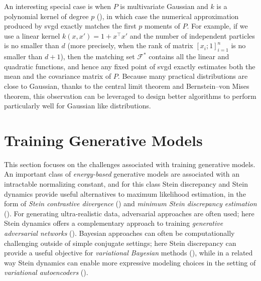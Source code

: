 \documentclass[12pt,paper=letter]{scrreprt}
\newcommand{\vx}{x}
\begin{document}
An interesting special case is when $P$ is multivariate Gaussian and $k$ is a polynomial kernel of degree $p$ (), in which case the numerical approximation produced by \ac{svgd} exactly matches the first $p$ moments of $P$.
For example, if we use a linear kernel  $k(\vx,x') = 1 + x^\top x'$ and the 
number of independent particles is no smaller than $d$ (more precisely, when the rank of matrix $[x_i;1]_{i=1}^n$ is no smaller than $d+1$), then the matching set $\mathcal F^*$ contains all the linear and quadratic functions, and hence any fixed point of \ac{svgd} exactly estimates both the mean and the covariance matrix of $P$. 
Because many practical distributions are close to Gaussian, thanks to the central limit theorem and Bernstein–von Mises theorem, this observation can be leveraged to design better algorithms to perform particularly well for Gaussian like distributions. %

































\section{Training Generative Models}
\label{sec: param est}

This section focuses on the challenges associated with training generative models.
An important class of \emph{energy-based} generative models are associated with an intractable normalizing constant, and for this class Stein discrepancy and Stein dynamics provide useful alternatives to maximum likelihood estimation, in the form of \emph{Stein contrastive divergence} () and \emph{minimum Stein discrepancy estimation} ().
For generating ultra-realistic data, adversarial approaches are often used; here Stein dynamics offers a complementary approach to training \emph{generative adversarial networks} ().
Bayesian approaches can often be computationally challenging outside of simple conjugate settings; here Stein discrepancy can provide a useful objective for \emph{variational Bayesian} methods (), while in a related way Stein dynamics can enable more expressive modeling choices in the setting of \emph{variational autoencoders} ().
\end{document}
